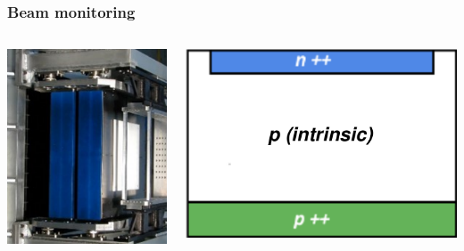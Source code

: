 \documentclass[aspectratio=169]{beamer}
\begin{document}
	\begin{frame}
		\frametitle{Beam monitoring}
		\begin{columns}
			\begin{center}
				\includegraphics[width=0.95 \textwidth]{IMG/Ionization_Chamber.PNG}
			\end{center}
			\begin{center}
				\includegraphics[width=0.95 \textwidth]{IMG/Solid_State_Detector.PNG}

\end{center}
\end{columns}
\end{frame}
\end{document}
